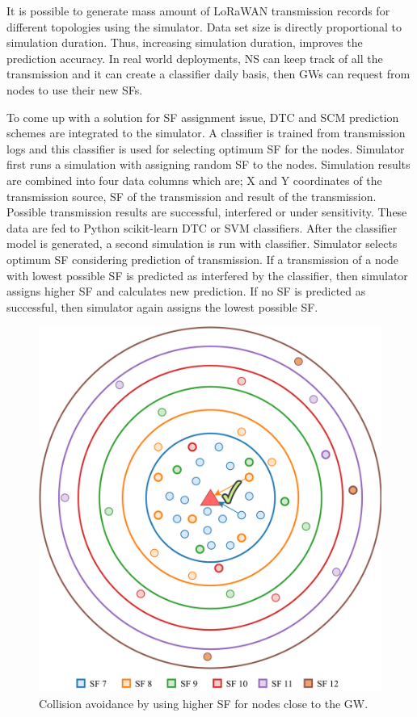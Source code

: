 \documentclass[conference]{IEEEtran}
\begin{document}
\par It is possible to generate mass amount of LoRaWAN transmission records for different topologies using the simulator. Data set size is directly proportional to simulation duration. Thus, increasing simulation duration, improves the prediction accuracy. In real world deployments, NS can keep track of all the transmission and it can create a classifier daily basis, then GWs can request from nodes to use their new SFs.

\par To come up with a solution for SF assignment issue, DTC and SCM prediction schemes are integrated to the simulator. A classifier is trained from transmission logs and this classifier is used for selecting optimum SF for the nodes. Simulator first runs a simulation with assigning random SF to the nodes. Simulation results are combined into four data columns which are; X and Y coordinates of the transmission source, SF of the transmission and result of the transmission. Possible transmission results are successful, interfered or under sensitivity. These data are fed to Python scikit-learn DTC or SVM classifiers. After the classifier model is generated, a second simulation is run with classifier. Simulator selects optimum SF considering prediction of transmission. If a transmission of a node with lowest possible SF is predicted as interfered by the classifier, then simulator assigns higher SF and calculates new prediction. If no SF is predicted as successful, then simulator again assigns the lowest possible SF.

\begin{figure}
\centering
\includegraphics[width=\linewidth]{collision_solution_single_gw}
\caption{Collision avoidance by using higher SF for nodes close to the GW.}
\label{fig:collision_solution_single_gw}
\end{figure}
\end{document}

